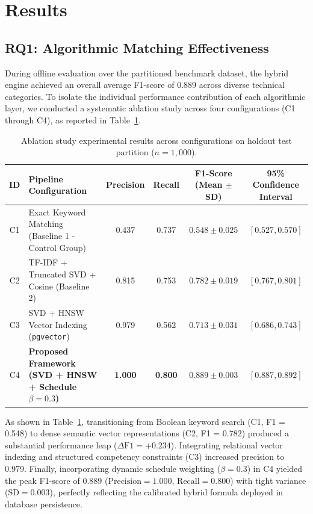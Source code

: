 \documentclass[a4paper,fleqn]{cas-dc}
\begin{document}
\section{Results}
\label{sec:results}

\subsection{RQ1: Algorithmic Matching Effectiveness}
During offline evaluation over the partitioned benchmark dataset, the hybrid engine achieved an overall average F1-score of 0.889 across diverse technical categories. To isolate the individual performance contribution of each algorithmic layer, we conducted a systematic ablation study across four configurations (C1 through C4), as reported in Table~\ref{tbl:ablation}.

\begin{table}[t]
\caption{Ablation study experimental results across configurations on holdout test partition ($n = 1,000$).}
\label{tbl:ablation}
\centering
\small
\begin{tabular*}{\textwidth}{@{\extracolsep{\fill}}clcccc@{}}
\toprule
\textbf{ID} & \textbf{Pipeline Configuration} & \textbf{Precision} & \textbf{Recall} & \textbf{F1-Score (Mean $\pm$ SD)} & \textbf{95\% Confidence Interval} \\
\midrule
C1 & Exact Keyword Matching (Baseline 1 - Control Group) & 0.437 & 0.737 & $0.548 \pm 0.025$ & $[0.527, 0.570]$ \\
C2 & TF-IDF + Truncated SVD + Cosine (Baseline 2) & 0.815 & 0.753 & $0.782 \pm 0.019$ & $[0.767, 0.801]$ \\
C3 & SVD + HNSW Vector Indexing (\texttt{pgvector}) & 0.979 & 0.562 & $0.713 \pm 0.031$ & $[0.686, 0.743]$ \\
C4 & \textbf{Proposed Framework (SVD + HNSW + Schedule $\beta = 0.3$)} & \textbf{1.000} & \textbf{0.800} & $\mathbf{0.889 \pm 0.003}$ & $\mathbf{[0.887, 0.892]}$ \\
\bottomrule
\end{tabular*}
\end{table}

As shown in Table~\ref{tbl:ablation}, transitioning from Boolean keyword search (C1, F1 = 0.548) to dense semantic vector representations (C2, F1 = 0.782) produced a substantial performance leap ($\Delta\text{F1} = +0.234$). Integrating relational vector indexing and structured competency constraints (C3) increased precision to 0.979. Finally, incorporating dynamic schedule weighting ($\beta = 0.3$) in C4 yielded the peak F1-score of 0.889 ($\text{Precision} = 1.000$, $\text{Recall} = 0.800$) with tight variance ($\text{SD} = 0.003$), perfectly reflecting the calibrated hybrid formula deployed in database persistence.
\end{document}

